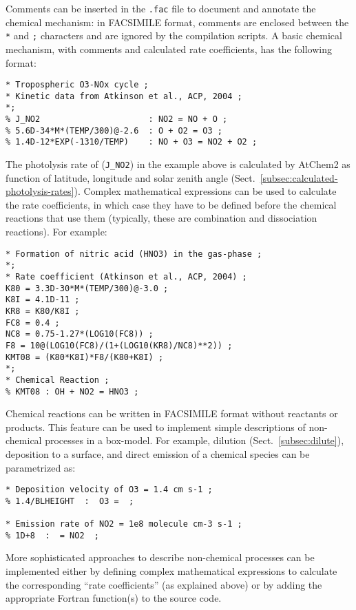 Comments can be inserted in the \texttt{.fac} file to document and
annotate the chemical mechanism: in FACSIMILE format, comments are
enclosed between the \texttt{*} and \texttt{;} characters and are
ignored by the compilation scripts. A basic chemical mechanism, with
comments and calculated rate coefficients, has the following format:

\begin{verbatim}
* Tropospheric O3-NOx cycle ;
* Kinetic data from Atkinson et al., ACP, 2004 ;
*;
% J_NO2                      : NO2 = NO + O ;
% 5.6D-34*M*(TEMP/300)@-2.6  : O + O2 = O3 ;
% 1.4D-12*EXP(-1310/TEMP)    : NO + O3 = NO2 + O2 ;
\end{verbatim}

The photolysis rate of  (\texttt{J\_NO2}) in the example above
is calculated by AtChem2 as function of latitude, longitude and solar
zenith angle (Sect.~\ref{subsec:calculated-photolysis-rates}).
Complex mathematical expressions can be used to calculate the rate
coefficients, in which case they have to be defined before the
chemical reactions that use them (typically, these are combination and
dissociation reactions). For example:

\begin{verbatim}
* Formation of nitric acid (HNO3) in the gas-phase ;
*;
* Rate coefficient (Atkinson et al., ACP, 2004) ;
K80 = 3.3D-30*M*(TEMP/300)@-3.0 ;
K8I = 4.1D-11 ;
KR8 = K80/K8I ;
FC8 = 0.4 ;
NC8 = 0.75-1.27*(LOG10(FC8)) ;
F8 = 10@(LOG10(FC8)/(1+(LOG10(KR8)/NC8)**2)) ;
KMT08 = (K80*K8I)*F8/(K80+K8I) ;
*;
* Chemical Reaction ;
% KMT08 : OH + NO2 = HNO3 ;
\end{verbatim}

Chemical reactions can be written in FACSIMILE format without
reactants or products. This feature can be used to implement simple
descriptions of non-chemical processes in a box-model. For example,
dilution (Sect.~\ref{subsec:dilute}), deposition to a surface, and
direct emission of a chemical species can be parametrized as:

\begin{verbatim}
* Deposition velocity of O3 = 1.4 cm s-1 ;
% 1.4/BLHEIGHT  :  O3 =  ;

* Emission rate of NO2 = 1e8 molecule cm-3 s-1 ;
% 1D+8  :  = NO2  ;
\end{verbatim}

More sophisticated approaches to describe non-chemical processes can
be implemented either by defining complex mathematical expressions to
calculate the corresponding ``rate coefficients'' (as explained above)
or by adding the appropriate Fortran function(s) to the source code.

